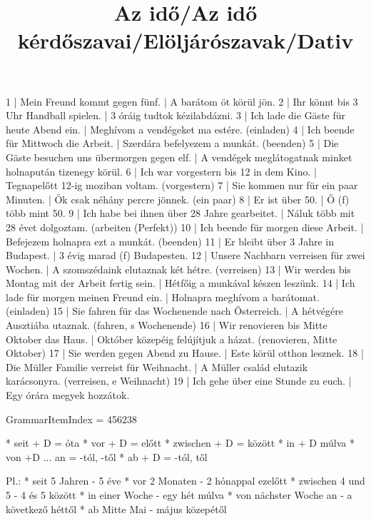 \begin{exmp}
1 | Mein Freund kommt gegen fünf. | A barátom öt körül jön.
2 | Ihr könnt bis 3 Uhr Handball spielen. | 3 óráig tudtok kézilabdázni.
3 | Ich lade die Gäste für heute Abend ein. | Meghívom a vendégeket ma estére. (einladen)
4 | Ich beende für Mittwoch die Arbeit. | Szerdára befelyezem a munkát. (beenden)
5 | Die Gäste besuchen uns übermorgen gegen elf. | A vendégek meglátogatnak minket holnapután tizenegy körül.
6 | Ich war vorgestern bis 12 in dem Kino. | Tegnapelőtt 12-ig moziban voltam. (vorgestern)
7 | Sie kommen nur für ein paar Minuten. | Ők csak néhány percre jönnek. (ein paar) 
8 | Er ist über 50. | Ő (f) több mint 50.
9 | Ich habe bei ihnen über 28 Jahre gearbeitet. | Náluk több mit 28 évet dolgoztam. (arbeiten (Perfekt))
10 | Ich beende für morgen diese Arbeit. | Befejezem holnapra ezt a munkát. (beenden)
11 | Er bleibt über 3 Jahre in Budapest. | 3 évig marad (f) Budapesten.
12 | Unsere Nachbarn verreisen für zwei Wochen. | A szomszédaink elutaznak két hétre. (verreisen)
13 | Wir werden bis Montag mit der Arbeit fertig sein. | Hétfőig a munkával készen leszünk.
14 | Ich lade für morgen meinen Freund ein. | Holnapra meghívom a barátomat. (einladen)
15 | Sie fahren für das Wochenende nach Österreich. | A hétvégére Ausztiába utaznak. (fahren, s Wochenende)
16 | Wir renovieren bis Mitte Oktober das Haus. | Október közepéig felújítjuk a házat. (renovieren, Mitte Oktober)
17 | Sie werden gegen Abend zu Hause. | Este körül otthon lesznek.
18 | Die Müller Familie verreist für Weihnacht. | A Müller család elutazik karácsonyra. (verreisen, e Weihnacht)
19 | Ich gehe über eine Stunde zu euch. | Egy órára megyek hozzátok.
\end{exmp}

\title{Az idő/Az idő kérdőszavai/Elöljárószavak/Dativ}

GrammarItemIndex = 456238

\begin{desc}
* seit + D = óta
* vor  + D = előtt
* zwischen + D = között
* in + D múlva
* von +D ... an = -tól, -től
* ab + D = -tól, től

Pl.: * seit 5 Jahren - 5 éve
* vor 2 Monaten - 2 hónappal ezelőtt
* zwischen 4 und 5 - 4 és 5 között
* in einer Woche - egy hét múlva
* von nächster Woche an - a következő héttől
* ab Mitte Mai - május közepétől
\end{desc}

